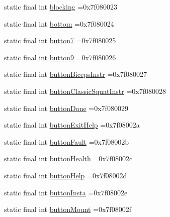 \begin{DoxyCompactItemize}
static final int \mbox{\hyperlink{classcom_1_1example_1_1trainawearapplication_1_1_r_1_1id_a2b505ccda7f7c98da2c29aec1b59412b}{blocking}} =0x7f080023
\item 
static final int \mbox{\hyperlink{classcom_1_1example_1_1trainawearapplication_1_1_r_1_1id_aba9da52b1f6229f419bc79d87de9bb17}{bottom}} =0x7f080024
\item 
static final int \mbox{\hyperlink{classcom_1_1example_1_1trainawearapplication_1_1_r_1_1id_a534348502a5c9b09421016e9e062c5ec}{button7}} =0x7f080025
\item 
static final int \mbox{\hyperlink{classcom_1_1example_1_1trainawearapplication_1_1_r_1_1id_afa1dec36f6a4c7c775e8ada2d8258746}{button9}} =0x7f080026
\item 
static final int \mbox{\hyperlink{classcom_1_1example_1_1trainawearapplication_1_1_r_1_1id_a9a1b7a515a859161b03db02ce7e549b0}{button\+Biceps\+Instr}} =0x7f080027
\item 
static final int \mbox{\hyperlink{classcom_1_1example_1_1trainawearapplication_1_1_r_1_1id_ae6b96190ec546ce73527110d9a7fe12e}{button\+Classic\+Squat\+Instr}} =0x7f080028
\item 
static final int \mbox{\hyperlink{classcom_1_1example_1_1trainawearapplication_1_1_r_1_1id_add45d60fd49efbedb579b5e51d50fa4f}{button\+Done}} =0x7f080029
\item 
static final int \mbox{\hyperlink{classcom_1_1example_1_1trainawearapplication_1_1_r_1_1id_a31edb6c04f8d4e212e97edfc50093f3c}{button\+Exit\+Help}} =0x7f08002a
\item 
static final int \mbox{\hyperlink{classcom_1_1example_1_1trainawearapplication_1_1_r_1_1id_aa8ba71986b6d76f36594480f4813f131}{button\+Fault}} =0x7f08002b
\item 
static final int \mbox{\hyperlink{classcom_1_1example_1_1trainawearapplication_1_1_r_1_1id_aee1ade8a096bb94ddaa260e94ff83983}{button\+Health}} =0x7f08002c
\item 
static final int \mbox{\hyperlink{classcom_1_1example_1_1trainawearapplication_1_1_r_1_1id_ac19404c64cdc6e2310d8873930fa2794}{button\+Help}} =0x7f08002d
\item 
static final int \mbox{\hyperlink{classcom_1_1example_1_1trainawearapplication_1_1_r_1_1id_a4b4c902dc62e1494e0132cdb275a7639}{button\+Insta}} =0x7f08002e
\item 
static final int \mbox{\hyperlink{classcom_1_1example_1_1trainawearapplication_1_1_r_1_1id_a6c4fdd6156c22bda2b7d1a23a3d34060}{button\+Mount}} =0x7f08002f
\item 

\end{DoxyCompactItemize}
